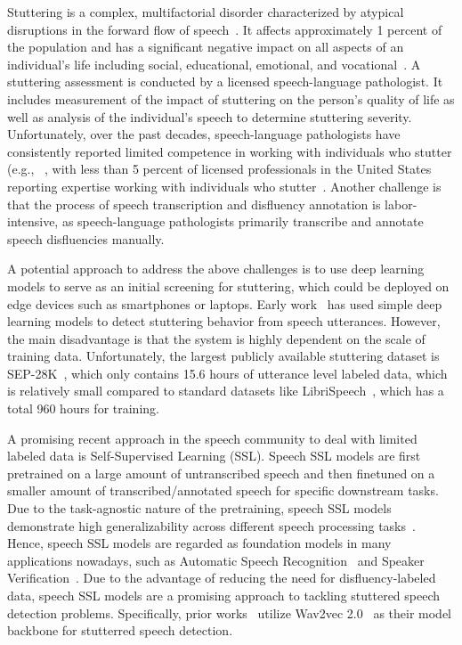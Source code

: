 Stuttering is a complex, multifactorial disorder characterized by atypical disruptions in the forward flow of speech~\cite{Smith_and_Weber}. It affects approximately 1 percent of the population and has a significant negative impact on all aspects of an individual’s life including social, educational, emotional, and vocational~\cite{craig_and_Tran,Koedoot_2011}.
A stuttering assessment is conducted by a licensed speech-language pathologist. It includes measurement of the impact of stuttering on the person’s quality of life as well as analysis of the individual’s speech to determine stuttering severity. Unfortunately, over the past decades, speech-language pathologists have consistently reported limited competence in working with individuals who stutter 
(e.g.,~\cite{Brisk_1997,Gabel_2013,kelly_1997,stLouis_1994}
, with less than 5 percent of licensed professionals in the United States reporting expertise working with individuals who stutter~\cite{Coalson_2016,kelly_1997}.
Another challenge is that the process of speech transcription and disfluency annotation is labor-intensive, as speech-language pathologists primarily transcribe and annotate speech disfluencies manually.  

A potential approach to address the above challenges is to use deep learning models to serve as an initial screening for stuttering, which could be deployed on edge devices such as smartphones or laptops. 
Early work~\cite{sheikhStutterNet,Kourkounakis2021FluentNetED}
has used simple deep learning models to detect stuttering behavior from speech utterances.
However, the main disadvantage is that the system is highly dependent on the scale of training data.
Unfortunately, the largest publicly available stuttering dataset is SEP-28K~\cite{lea_Sep28k}, which only contains 15.6 hours of utterance level labeled data, which is relatively small compared to standard datasets like LibriSpeech~\cite{librispeech}, which has a total 960 hours for training.

A promising recent approach in the speech community to deal with limited labeled data is Self-Supervised Learning (SSL).
Speech SSL models are first pretrained on a large amount of untranscribed speech and then finetuned on a smaller amount of transcribed/annotated speech for specific downstream tasks.
Due to the task-agnostic nature of the pretraining, speech SSL models demonstrate high generalizability across different speech processing tasks~\cite{yang21c_superb}.
Hence, speech SSL models are regarded as foundation models in many applications nowadays, such as Automatic Speech Recognition~\cite{baevski2021wav2vec-u,liu2022wav2vec-u2} and Speaker Verification~\cite{Peng_SSL_sv_2023}.
Due to the advantage of reducing the need for disfluency-labeled data, speech SSL models are a promising approach to tackling stuttered speech detection problems.
Specifically, prior works~\cite{Payal_iccasp_Siamese,bayerl22b_interspeech,bayerl23_interspeech} utilize Wav2vec 2.0~\cite{wav2vec2} as their model backbone for stutterred speech detection.

